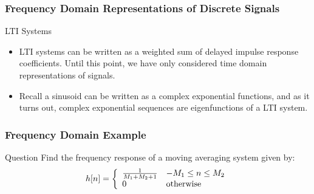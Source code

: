 \documentclass[mathserif,9pt]{beamer}
\begin{document}
\begin{frame}\frametitle{Frequency Domain Representations of Discrete Signals}\small
  \begin{block}{LTI Systems}
    \begin{itemize}
      \item LTI systems can be written as a weighted sum of delayed impulse response coefficients. Until this point, we have only considered time domain representations of signals.   
      \item Recall a sinusoid can be written as a complex exponential functions, and as it turns out, complex exponential sequences are eigenfunctions of a LTI system. 
    \end{itemize}
  \end{block}
  
\end{frame}

\begin{frame}\frametitle{Frequency Domain Example}
   
   \begin{block}{Question}
   Find the frequency response of a moving averaging system  given by: 
   \begin{align}
     h[n] = \left\{
       \begin{array}{l l}
         \frac{1}{M_1+M_2+1} & -M_1 \leq n \leq M_2 \\
         0 & \textrm{otherwise}
       \end{array}
     \right. \nonumber
   \end{align}
   \end{block}
\end{frame}
\end{document}
